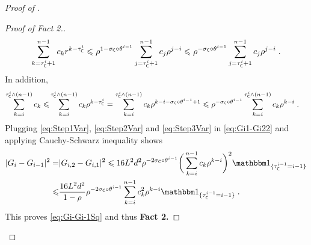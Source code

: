 \documentclass[leqno,11pt,a4paper]{article}
\begin{document}
\begin{proof}[Proof of ]
\begin{proof}[Proof of Fact 2.]
\begin{equation}\label{eq:Step2Var}
\sum_{k=\tau_{\mathsf{C}}^i+1}^{n-1}c_kr^{k-\tau_{\mathsf{C}}^i}\leqslant \rho^{1-\sigma_{\mathsf{C}}\circ\theta^{i-1}} \sum_{j=\tau^i_{\mathsf{C}}+1}^{n-1}c_j\rho^{j-i}\leqslant \rho^{-\sigma_{\mathsf{C}}\circ\theta^{i-1}}\sum_{j=\tau^i_{\mathsf{C}}+1}^{n-1}c_j\rho^{j-i}\;.
\end{equation}
In addition,
\begin{align}\label{eq:Step3Var}
 \sum_{k=i}^{\tau_{\mathsf{C}}^i\wedge (n-1)}c_k\leqslant &\sum_{k=i}^{\tau_{\mathsf{C}}^i\wedge (n-1)}c_k\rho^{k-\tau_{\mathsf{C}}^i}=\sum_{k=i}^{\tau_{\mathsf{C}}^i\wedge (n-1)}c_k\rho^{k-i-\sigma_{\mathsf{C}}\circ\theta^{i-1}+1}\leqslant \rho^{-\sigma_{\mathsf{C}}\circ\theta^{i-1}}\sum_{k=i}^{\tau_{\mathsf{C}}^i\wedge (n-1)}c_k\rho^{k-i}\;.
\end{align}
Plugging \eqref{eq:Step1Var}, \eqref{eq:Step2Var} and \eqref{eq:Step3Var} in \eqref{eq:Gi1-Gi22} and applying Cauchy-Schwarz inequality shows
\begin{align*}
 |G_{i}-G_{i-1}|^2=&|G_{i,2}-G_{i,1}|^2\leqslant16L^2d^2\rho^{-2\sigma_{\cC}\circ\theta^{i-1}}\bigg(\sum_{k=i}^{n-1}c_k\rho^{k-i}\bigg)^2\indiacc{\tau_{\cC}^{i-1}=i-1}\\
 \leqslant &\frac{16L^2d^2}{1-\rho}\rho^{-2\sigma_{\cC}\circ\theta^{i-1}}\sum_{k=i}^{n-1}c_k^2\rho^{k-i}\indiacc{\tau_{\cC}^{i-1}=i-1}\eqsp.
\end{align*}
This proves \eqref{eq:Gi-Gi-1Sq} and thus {\bf Fact 2.}
\end{proof}



\end{proof}
\end{document}
